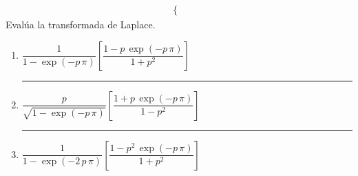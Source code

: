 \begin{enumerate}
\begin{align*}
\begin{cases}
\end{cases}
\end{align*} 
Evalúa la transformada de Laplace.
\begin{enumerate}[label=3.\alph*)]
\setlength\itemsep{1.5em}
\item $\dfrac{1}{1 - \exp(-p \, \pi)} \left[ \dfrac{1 - p \, \exp(-p \, \pi)}{1 + p^{2}} \right]$ \hrule
\item $\dfrac{p}{\sqrt{1 - \exp(-p \, \pi)}} \left[ \dfrac{1 + p \, \exp(-p \, \pi)}{1 - p^{2}} \right]$ \hrule
\item $\dfrac{1}{1 - \exp(-2\, p \, \pi)} \left[ \dfrac{1 - p^{2} \, \exp(-p \, \pi)}{1 + p^{2}} \right]$ 
\end{enumerate}
\end{enumerate}
